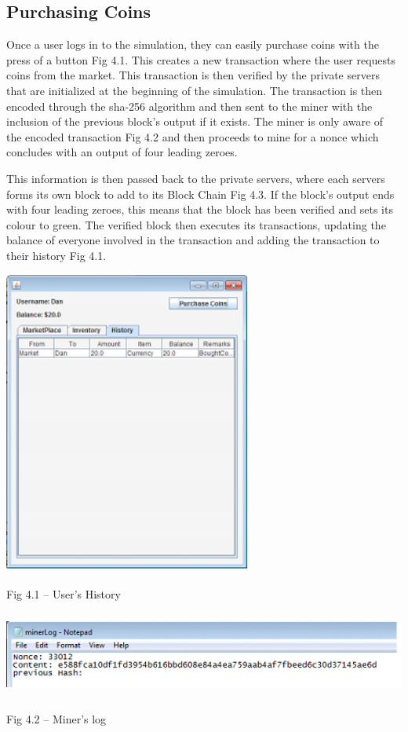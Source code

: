 \documentclass{article} %
\begin{document}
\noindent 
\subsection{Purchasing Coins}

\begin{flushleft}
Once a user logs in to the simulation, they can easily purchase coins with the press of a button Fig 4.1. This creates a new transaction where the user requests coins from the market. This transaction is then verified by the private servers that are initialized at the beginning of the simulation. The transaction is then encoded through the sha-256 algorithm and then sent to the miner with the inclusion of the previous block's output if it exists. The miner is only aware of the encoded transaction Fig 4.2 and then proceeds to mine for a nonce which concludes with an output of four leading zeroes. 

This information is then passed back to the private servers, where each servers forms its own block to add to its Block Chain Fig 4.3. If the block's output ends with four leading zeroes, this means that the block has been verified and sets its colour to green. The verified block then executes its transactions, updating the balance of everyone involved in the transaction and adding the transaction to their history Fig 4.1.
\end{flushleft}

\noindent \begin{center}
\includegraphics*[bb=0 0 3.24in 3.95in, width=3.24in, height=3.95in, keepaspectratio=false]{image1.png}

\noindent Fig 4.1 -- User's History

\noindent \includegraphics*[bb=0 0 6.53in 1.11in, width=6.53in, height=1.11in, keepaspectratio=false]{image2.png}

\noindent Fig 4.2 -- Miner's log
\end{center}
\end{document}
